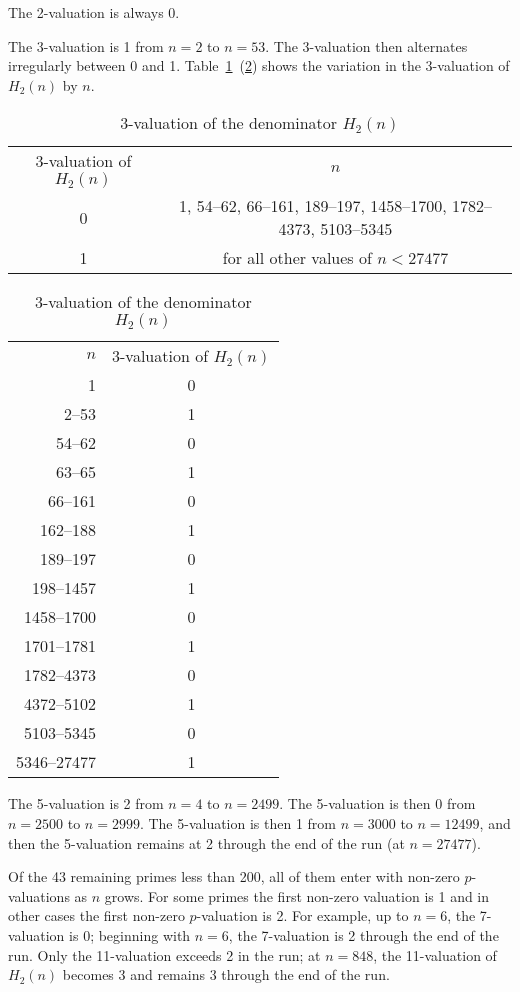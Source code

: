 \documentclass{article}
\begin{document}
The 2-valuation is always 0.

The 3-valuation is 1 from $n=2$ to $n=53$. The 3-valuation then
alternates irregularly between 0 and 1. Table~\ref{tab:3-val-of-H2}~(\ref{tab:3-val-of-H2-alt})
shows the variation in the 3-valuation of $H_2\left(n\right)$ by $n$.
\begin{table}[H]
  \centering
  \caption{3-valuation of the denominator $H_2\left(n\right)$}
  \label{tab:3-val-of-H2}
\begin{tabular}{cc}
  3-valuation of $H_2\left(n\right)$ & $n$\\
  0 & 1, 54--62, 66--161, 189--197, 1458--1700, 1782--4373, 5103--5345\\
  1 & for all other values of $n<27477$
\end{tabular}
\end{table}

\begin{table}[H]
  \centering
  \caption{3-valuation of the denominator $H_2\left(n\right)$}
  \label{tab:3-val-of-H2-alt}
\begin{tabular}{rc}
  $n$         & 3-valuation of $H_2\left(n\right)$\\
  1           &  0\\
  2--53       &  1\\
  54--62      &  0\\
  63--65      &  1\\
  66--161     &  0\\
  162--188    &  1\\
  189--197    &  0\\
  198--1457   &  1\\
  1458--1700  &  0\\
  1701--1781  &  1\\
  1782--4373  &  0\\
  4372--5102  &  1\\
  5103--5345  &  0\\
  5346--27477 &  1
\end{tabular}
\end{table}


The 5-valuation is 2 from $n=4$ to $n=2499$. The 5-valuation is then 0
from $n=2500$ to $n=2999$. The 5-valuation is then 1 from $n=3000$ to
$n=12499$, and then the 5-valuation remains at 2 through the end of
the run (at $n=27477$).

Of the 43 remaining primes less than 200, all of them enter with
non-zero $p$-valuations as $n$ grows. For some primes the first
non-zero valuation is 1 and in other cases the first non-zero
$p$-valuation is 2. For example, up to $n=6$, the 7-valuation is 0;
beginning with $n=6$, the 7-valuation is 2 through the end of the
run. Only the 11-valuation exceeds 2 in the run; at $n=848$, the
11-valuation of $H_2\left(n\right)$ becomes 3 and remains 3 through
the end of the run.
\end{document}
